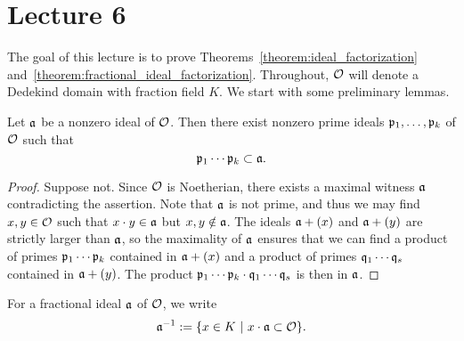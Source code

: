 \section{Lecture 6}

The goal of this lecture is to prove Theorems~\ref{theorem:ideal_factorization} and~\ref{theorem:fractional_ideal_factorization}.
Throughout, $\mathcal{O}$ will denote a Dedekind domain with fraction field $K$.
We start with some preliminary lemmas.

\begin{lemma}
  Let $\mathfrak{a}$ be a nonzero ideal of $\mathcal{O}$.
  Then there exist nonzero prime ideals $\mathfrak{p}_{1},\ldots,\mathfrak{p}_{k}$ of $\mathcal{O}$ such that
  \[ \mathfrak{p}_{1} \cdots \mathfrak{p}_{k} \subset \mathfrak{a}. \]
\end{lemma}
\begin{proof}
  Suppose not.
  Since $\mathcal{O}$ is Noetherian, there exists a maximal witness $\mathfrak{a}$ contradicting the assertion.
  Note that $\mathfrak{a}$ is not prime, and thus we may find $x,y \in \mathcal{O}$ such that $x \cdot y \in \mathfrak{a}$ but $x,y \notin \mathfrak{a}$.
  The ideals $\mathfrak{a} + (x)$ and $\mathfrak{a} + (y)$ are strictly larger than $\mathfrak{a}$, so the maximality of $\mathfrak{a}$ ensures that we can find a product of primes $\mathfrak{p}_{1} \cdots \mathfrak{p}_{k}$ contained in $\mathfrak{a} + (x)$ and a product of primes $\mathfrak{q}_{1} \cdots \mathfrak{q}_{s}$ contained in $\mathfrak{a} + (y)$.
  The product $\mathfrak{p}_{1} \cdots \mathfrak{p}_{k} \cdot \mathfrak{q}_{1} \cdots \mathfrak{q}_{s}$ is then  in $\mathfrak{a}$.
\end{proof}

\begin{definition}
  For a fractional ideal $\mathfrak{a}$ of $\mathcal{O}$, we write
  \[ \mathfrak{a}^{-1} := \{x \in K \ | \ x \cdot \mathfrak{a} \subset \mathcal{O}\}. \]
\end{definition}

